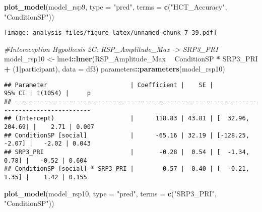 \documentclass[
]{article}
\newenvironment{Shaded}{\begin{snugshade}}{\end{snugshade}}
\newcommand{\CommentTok}[1]{\textcolor[rgb]{0.56,0.35,0.01}{\textit{#1}}}
\newcommand{\DataTypeTok}[1]{\textcolor[rgb]{0.13,0.29,0.53}{#1}}
\newcommand{\DecValTok}[1]{\textcolor[rgb]{0.00,0.00,0.81}{#1}}
\newcommand{\KeywordTok}[1]{\textcolor[rgb]{0.13,0.29,0.53}{\textbf{#1}}}
\newcommand{\NormalTok}[1]{#1}
\newcommand{\OperatorTok}[1]{\textcolor[rgb]{0.81,0.36,0.00}{\textbf{#1}}}
\newcommand{\StringTok}[1]{\textcolor[rgb]{0.31,0.60,0.02}{#1}}
\begin{document}
\begin{Shaded}
\begin{Highlighting}[]
\KeywordTok{plot_model}\NormalTok{(model_rsp9, }\DataTypeTok{type =} \StringTok{"pred"}\NormalTok{, }\DataTypeTok{terms =} \KeywordTok{c}\NormalTok{(}\StringTok{"HCT_Accuracy"}\NormalTok{, }\StringTok{"ConditionSP"}\NormalTok{))}
\end{Highlighting}
\end{Shaded}

\texttt{[image: analysis\_files/figure-latex/unnamed-chunk-7-39.pdf]}

\begin{Shaded}
\begin{Highlighting}[]
\CommentTok{#Interoception Hypothesis 2C: RSP_Amplitude_Max -> SRP3_PRI}
\NormalTok{model_rsp10 <-}\StringTok{ }\NormalTok{lme4}\OperatorTok{::}\KeywordTok{lmer}\NormalTok{(RSP_Amplitude_Max }\OperatorTok{~}\StringTok{ }\NormalTok{ConditionSP }\OperatorTok{*}\StringTok{ }\NormalTok{SRP3_PRI }\OperatorTok{+}\StringTok{ }\NormalTok{(}\DecValTok{1}\OperatorTok{|}\NormalTok{participant), }\DataTypeTok{data =}\NormalTok{ df3)}
\NormalTok{parameters}\OperatorTok{::}\KeywordTok{parameters}\NormalTok{(model_rsp10)}
\end{Highlighting}
\end{Shaded}

\begin{verbatim}
## Parameter                       | Coefficient |    SE |            95% CI | t(1054) |     p
## -------------------------------------------------------------------------------------------
## (Intercept)                     |      118.83 | 43.81 | [  32.96, 204.69] |    2.71 | 0.007
## ConditionSP [social]            |      -65.16 | 32.19 | [-128.25,  -2.07] |   -2.02 | 0.043
## SRP3_PRI                        |       -0.28 |  0.54 | [  -1.34,   0.78] |   -0.52 | 0.604
## ConditionSP [social] * SRP3_PRI |        0.57 |  0.40 | [  -0.21,   1.35] |    1.42 | 0.155
\end{verbatim}

\begin{Shaded}
\begin{Highlighting}[]
\KeywordTok{plot_model}\NormalTok{(model_rsp10, }\DataTypeTok{type =} \StringTok{"pred"}\NormalTok{, }\DataTypeTok{terms =} \KeywordTok{c}\NormalTok{(}\StringTok{"SRP3_PRI"}\NormalTok{, }\StringTok{"ConditionSP"}\NormalTok{))}
\end{Highlighting}
\end{Shaded}
\end{document}
